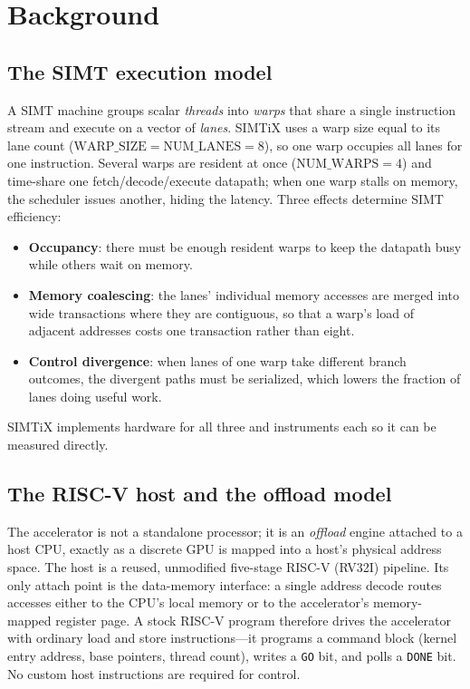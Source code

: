 \documentclass[12pt,a4paper,oneside]{report}
\newcommand{\code}[1]{\texttt{#1}}
\begin{document}
\chapter{Background}
\label{ch:background}

\section{The SIMT execution model}
A SIMT machine groups scalar \emph{threads} into \emph{warps} that share a single
instruction stream and execute on a vector of \emph{lanes}. SIMTiX uses a warp
size equal to its lane count ($\mathrm{WARP\_SIZE}=\mathrm{NUM\_LANES}=8$), so one
warp occupies all lanes for one instruction. Several warps are resident at once
($\mathrm{NUM\_WARPS}=4$) and time-share one fetch/decode/execute datapath; when
one warp stalls on memory, the scheduler issues another, hiding the latency.
Three effects determine SIMT efficiency:
\begin{itemize}
\item \textbf{Occupancy}: there must be enough resident warps to keep the
datapath busy while others wait on memory.
\item \textbf{Memory coalescing}: the lanes' individual memory accesses are
merged into wide transactions where they are contiguous, so that a warp's load of
adjacent addresses costs one transaction rather than eight.
\item \textbf{Control divergence}: when lanes of one warp take different branch
outcomes, the divergent paths must be serialized, which lowers the fraction of
lanes doing useful work.
\end{itemize}
SIMTiX implements hardware for all three and instruments each so it can be
measured directly.

\section{The RISC-V host and the offload model}
The accelerator is not a standalone processor; it is an \emph{offload} engine
attached to a host CPU, exactly as a discrete GPU is mapped into a host's
physical address space. The host is a reused, unmodified five-stage RISC-V
(RV32I) pipeline. Its only attach point is the data-memory interface: a single
address decode routes accesses either to the CPU's local memory or to the
accelerator's memory-mapped register page. A stock RISC-V program therefore
drives the accelerator with ordinary load and store instructions---it programs a
command block (kernel entry address, base pointers, thread count), writes a
\code{GO} bit, and polls a \code{DONE} bit. No custom host instructions are
required for control.
\end{document}

